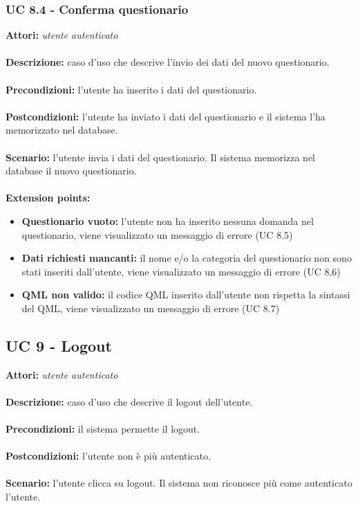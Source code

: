 \documentclass[a4paper,11pt]{article}
\begin{document}
\subsubsection{UC 8.4 - Conferma questionario}

\textbf{Attori:} \textit{utente autenticato}
\\ \\
\textbf{Descrizione:} caso d'uso che descrive l'invio dei dati del nuovo questionario.\\
\\
\textbf{Precondizioni:} l'utente ha inserito i dati del questionario.\\
\\
\textbf{Postcondizioni:} l’utente ha inviato i dati del questionario e il sistema l'ha memorizzato nel database.\\
\\
\textbf{Scenario:} l’utente invia i dati del questionario. Il sistema memorizza nel database il nuovo questionario.\\
\\
\textbf{Extension points:} 
\begin{itemize}
	\item \textbf{Questionario vuoto:} l'utente non ha inserito nessuna domanda nel questionario, viene visualizzato un messaggio di errore (UC 8.5)
	\item \textbf{Dati richiesti mancanti:} il nome e/o la categoria del questionario non sono stati inseriti dall'utente, viene visualizzato un messaggio di errore (UC 8.6)
	\item \textbf{QML non valido:} il codice QML inserito dall'utente non rispetta la sintassi del QML, viene visualizzato un messaggio di errore (UC 8.7)
\end{itemize}


\subsection{UC 9 - Logout}

\textbf{Attori:} \textit{utente autenticato}
\\ \\
\textbf{Descrizione:} caso d'uso che descrive il logout dell'utente.\\
\\
\textbf{Precondizioni:} il sistema permette il logout.\\
\\
\textbf{Postcondizioni:} l’utente non è più autenticato.\\
\\
\textbf{Scenario:} l’utente clicca su logout. Il sistema non riconosce più come autenticato l'utente.\\
\end{document}
